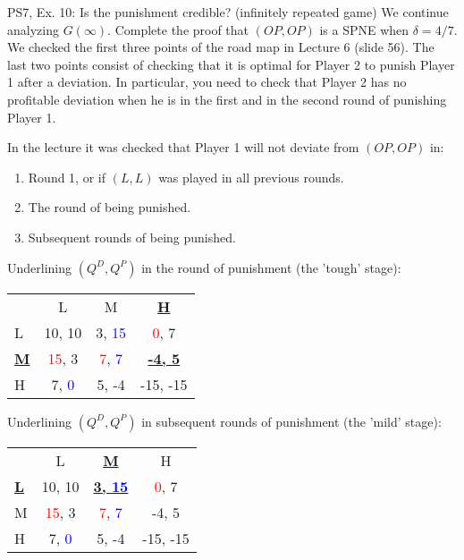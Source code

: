 \begin{frame}{PS7, Ex. 10: Is the punishment credible? (infinitely repeated game)}
    We continue analyzing $G(\infty)$. Complete the proof that $(OP,OP)$ is a SPNE when $\delta=4/7$. We checked the first three points of the road map in Lecture 6 (slide 56). The last two points consist of checking that it is optimal for Player 2 to punish Player 1 after a deviation. In particular, you need to check that Player 2 has no profitable deviation when he is in the first and in the second round of punishing Player 1.
    \begin{multicols}{2}
      In the lecture it was checked that Player 1 will not deviate from $(OP,OP)$ in:
      \begin{enumerate}
        \item Round 1, or if $(L,L)$ was played in all previous rounds.
        \item The  round of being punished.
        \item Subsequent rounds of being punished.
      \end{enumerate}
      \vfill\null\columnbreak
      Underlining $(Q^D,Q^P)$ in the  round of punishment (the 'tough' stage):
      \vspace{-6pt}
      \begin{table}
        \begin{tabular}{l|c|c|c|}
          \multicolumn{1}{c}{} & \multicolumn{1}{c}{L} & \multicolumn{1}{c}{M} & \multicolumn{1}{c}{\textbf{\underline{H}}} \\\cline{2-4}
          L & 10, 10 & 3, \textcolor{blue}{15} & \textcolor{red}{0}, 7 \\\cline{2-4}
          \textbf{\underline{M}} & \textcolor{red}{15}, 3 & \textcolor{red}{7}, \textcolor{blue}{7} & \textbf{\underline{-4, 5}} \\\cline{2-4}
          H & 7, \textcolor{blue}{0} & 5, -4 & -15, -15 \\\cline{2-4}
        \end{tabular}
      \end{table}
      Underlining $(Q^D,Q^P)$ in subsequent rounds of punishment (the 'mild' stage):
      \vspace{-6pt}
      \begin{table}
        \begin{tabular}{l|c|c|c|}
          \multicolumn{1}{c}{} & \multicolumn{1}{c}{L} & \multicolumn{1}{c}{\textbf{\underline{M}}} & \multicolumn{1}{c}{H} \\\cline{2-4}
          \textbf{\underline{L}} & 10, 10 & \textbf{\underline{3, \textcolor{blue}{15}}} & \textcolor{red}{0}, 7 \\\cline{2-4}
          M & \textcolor{red}{15}, 3 & \textcolor{red}{7}, \textcolor{blue}{7} & -4, 5 \\\cline{2-4}
          H & 7, \textcolor{blue}{0} & 5, -4 & -15, -15 \\\cline{2-4}
        \end{tabular}
      \end{table}
      \vfill\null
    \end{multicols}
    \vfill\null
\end{frame}
